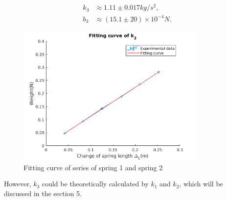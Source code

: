     \[
    \begin{split}
        k_3&\approx 1.11\pm 0.017kg/s^2,\\
        b_3&\approx (15.1\pm 20)\times10^{-4}N.        
    \end{split}
    \]
    \begin{figure}[h]
        \centering    
        \includegraphics[height=7cm]{images/k3.png}
        \caption{Fitting curve of series of spring 1 and spring 2}\label{k_3}
    \end{figure}

    However, $k_3$ could be theoretically calculated by $k_1$ and $k_2$, which will be discussed in the section 5.\\



